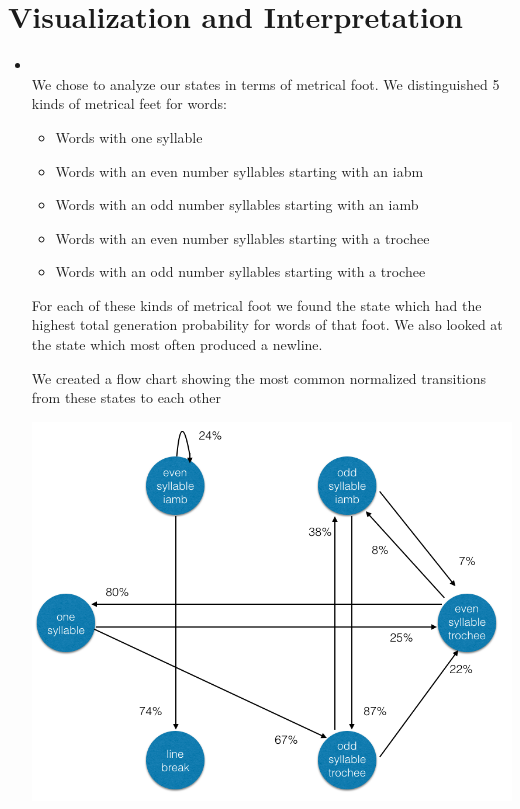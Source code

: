 \begin{itemize}
\end{itemize}



\section{Visualization and Interpretation}
\medskip
\begin{itemize}


    \item {} \\

    We chose to analyze our states in terms of metrical foot. We distinguished 5 kinds of metrical feet for words: 

    \begin{itemize}

    \item Words with one syllable
    
    \item Words with an even number syllables starting with an iabm
    
    \item Words with an odd number syllables starting with an iamb
    
    \item Words with an even number syllables starting with a trochee

    \item Words with an odd number syllables starting with a trochee 
    \end{itemize}

    For each of these kinds of metrical foot we found the state which had the highest total generation probability for words of that foot. We also looked at the state which most often produced a newline.

    We created a flow chart showing the most common normalized transitions from these states to each other

    \includegraphics[scale=0.5]{transitions.png}


\end{itemize}
